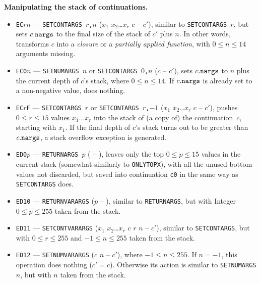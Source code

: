 \documentclass[12pt,oneside]{article}
\def\makepoint#1{\medbreak\noindent{\bf #1.\ }}
\def\nxsubpoint{\refstepcounter{subsubsection}%
  \smallbreak\makepoint{\thesubsubsection}}
\def\emb#1{\textbf{#1.}}
\begin{document}
\nxsubpoint\label{sp:cont.stk.manip}\emb{Manipulating the stack of continuations}
\begin{itemize}
\item {\tt EC$rn$} --- {\tt SETCONTARGS $r$,$n$} ($x_1$ $x_2$\dots$x_r$ $c$ -- $c'$), similar to {\tt SETCONTARGS $r$}, but sets $c.{\tt nargs}$ to the final size of the stack of $c'$ plus $n$. In other words, transforms $c$ into a {\em closure\/} or a {\em partially applied function}, with $0\leq n\leq 14$ arguments missing.  
\item {\tt EC0$n$} --- {\tt SETNUMARGS $n$} or {\tt SETCONTARGS $0$,$n$} ($c$ -- $c'$), sets $c.{\tt nargs}$ to $n$ plus the current depth of $c$'s stack, where $0\leq n\leq 14$. If $c.{\tt nargs}$ is already set to a non-negative value, does nothing.
\item {\tt EC$r$F} --- {\tt SETCONTARGS $r$} or {\tt SETCONTARGS $r$,$-1$} ($x_1$ $x_2$\dots$x_r$ $c$ -- $c'$), pushes $0\leq r\leq 15$ values $x_1\ldots x_r$ into the stack of (a copy of) the continuation~$c$, starting with $x_1$. If the final depth of $c$'s stack turns out to be greater than $c.{\tt nargs}$, a stack overflow exception is generated.
\item {\tt ED0$p$} --- {\tt RETURNARGS $p$} ( -- ), leaves only the top $0\leq p\leq 15$ values in the current stack (somewhat similarly to {\tt ONLYTOPX}), with all the unused bottom values not discarded, but saved into continuation {\tt c0} in the same way as {\tt SETCONTARGS} does.
\item {\tt ED10} --- {\tt RETURNVARARGS} ($p$ -- ), similar to {\tt RETURNARGS}, but with Integer $0\leq p\leq 255$ taken from the stack.
\item {\tt ED11} --- {\tt SETCONTVARARGS} ($x_1$ $x_2$\dots$x_r$ $c$ $r$ $n$ -- $c'$), similar to {\tt SETCONTARGS}, but with $0\leq r\leq 255$ and $-1\leq n\leq 255$ taken from the stack.
\item {\tt ED12} --- {\tt SETNUMVARARGS} ($c$ $n$ -- $c'$), where $-1\leq n\leq 255$. If $n=-1$, this operation does nothing ($c'=c$). Otherwise its action is similar to {\tt SETNUMARGS $n$}, but with $n$ taken from the stack.
\end{itemize}
\end{document}
